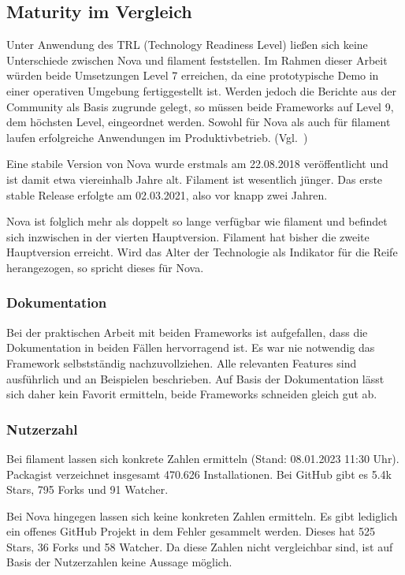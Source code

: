 \subsection{Maturity im Vergleich}
Unter Anwendung des TRL (Technology Readiness Level) ließen sich keine Unterschiede zwischen Nova und filament feststellen.
Im Rahmen dieser Arbeit würden beide Umsetzungen Level 7 erreichen, da eine prototypische Demo in einer operativen Umgebung fertiggestellt ist.
Werden jedoch die Berichte aus der Community als Basis zugrunde gelegt, so müssen beide Frameworks auf Level 9, dem höchsten Level, eingeordnet werden.
Sowohl für Nova als auch für filament laufen erfolgreiche Anwendungen im Produktivbetrieb.
(Vgl.~\cite{technology-readiness})

Eine stabile Version von Nova wurde erstmals am 22.08.2018\cite{nova-releases} veröffentlicht und ist damit etwa viereinhalb Jahre alt.
Filament ist wesentlich jünger.
Das erste stable Release erfolgte am 02.03.2021\cite{filament-releases}, also vor knapp zwei Jahren.

Nova ist folglich mehr als doppelt so lange verfügbar wie filament und befindet sich inzwischen in der vierten Hauptversion\cite{nova-releases}.
Filament hat bisher die zweite Hauptversion\cite{filament-releases} erreicht.
Wird das Alter der Technologie als Indikator für die Reife herangezogen, so spricht dieses für Nova.

\subsubsection{Dokumentation}
Bei der praktischen Arbeit mit beiden Frameworks ist aufgefallen, dass die Dokumentation in beiden Fällen hervorragend ist.
Es war nie notwendig das Framework selbstständig nachzuvollziehen.
Alle relevanten Features sind ausführlich und an Beispielen beschrieben.
Auf Basis der Dokumentation lässt sich daher kein Favorit ermitteln, beide Frameworks schneiden gleich gut ab.

\subsubsection{Nutzerzahl}
Bei filament lassen sich konkrete Zahlen ermitteln (Stand: 08.01.2023 11:30 Uhr).
Packagist verzeichnet insgesamt 470.626 Installationen.
Bei GitHub gibt es 5.4k Stars, 795 Forks und 91 Watcher.

Bei Nova hingegen lassen sich keine konkreten Zahlen ermitteln.
Es gibt lediglich ein offenes GitHub Projekt in dem Fehler gesammelt werden.
Dieses hat 525 Stars, 36 Forks und 58 Watcher.
Da diese Zahlen nicht vergleichbar sind, ist auf Basis der Nutzerzahlen keine Aussage möglich.

